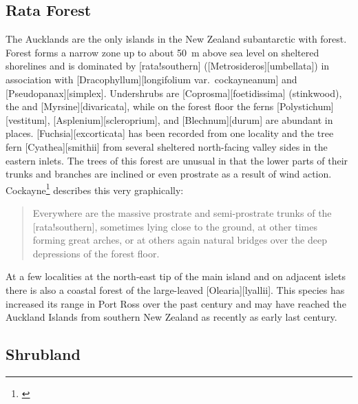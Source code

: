 \subsection{Rata Forest}

The Aucklands are the only islands in the New Zealand subantarctic with forest.
Forest forms a narrow zone up to about \SI{50}{\metre} above sea level on sheltered shorelines and is dominated by [rata!southern] ([Metrosideros][umbellata]) in association with [Dracophyllum][longifolium var.\ cockayneanum] and [Pseudopanax][simplex].
Undershrubs are [Coprosma][foetidissima] (stinkwood), the  and [Myrsine][divaricata], while on the forest floor the ferns [Polystichum][vestitum], [Asplenium][scleroprium], and [Blechnum][durum] are abundant in places. [Fuchsia][excorticata] has been recorded from one locality and the tree fern [Cyathea][smithii] from several sheltered north-facing valley sides in the eastern inlets.
The trees of this forest are unusual in that the lower parts of their trunks and branches are inclined or even prostrate as a result of wind action.
Cockayne\footnote{\cite{cockayne1909ecological}} describes this very graphically:

\begin{quote}
	Everywhere are the massive prostrate and semi-prostrate trunks of the [rata!southern], sometimes lying close to the ground, at other times forming great arches, or at others again natural bridges over the deep depressions of the forest floor.
\end{quote}

At a few localities at the north-east tip of the main island and on adjacent islets there is also a coastal forest of the large-leaved [Olearia][lyallii].
This species has increased its range in Port Ross over the past century and may have reached the Auckland Islands from southern New Zealand as recently as early last century.

\subsection{Shrubland}

